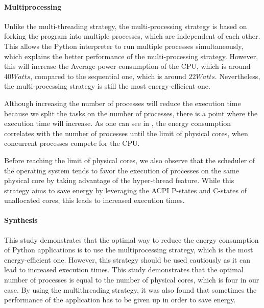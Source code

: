 \paragraph*{Multiprocessing}
Unlike the multi-threading strategy, the multi-processing strategy is based on forking the program into multiple processes, which are independent of each other. This allows the Python interpreter to run multiple processes simultaneously, which explains the better performance of the multi-processing strategy. However, this will increase the Average power consumption of the CPU, which is around $40 Watts$, compared to the sequential one, which is around $22 Watts$. Nevertheless, the multi-processing strategy is still the most energy-efficient one.


Although increasing the number of processes will reduce the execution time because we split the tasks on the number of processes, there is a point where the execution time will increase. As one can see in , the energy consumption correlates with the number of processes until the limit of physical cores, when concurrent processes compete for the CPU.


Before reaching the limit of physical cores, we also observe that the scheduler of the operating system tends to favor the execution of processes on the same physical core by taking advantage of the hyper-thread feature.
While this strategy aims to save energy by leveraging the ACPI P-states and C-states of unallocated cores, this leads to increased execution times.

\paragraph*{Synthesis}
This study demonstrates that the optimal way to reduce the energy consumption of Python applications is to use the multiprocessing strategy, which is the most energy-efficient one. However, this strategy should be used cautiously as it can lead to increased execution times.
This study demonstrates that the optimal number of processes is equal to the number of physical cores, which is four in our case.
By using the multithreading strategy, it was also found that sometimes the performance of the application has to be given up in order to save energy.

\clearpage

\clearpage
